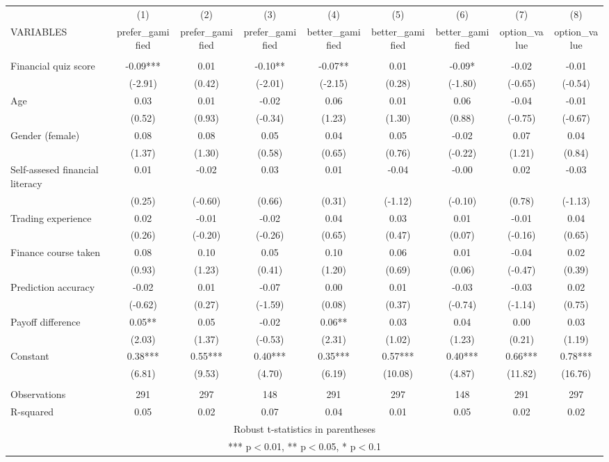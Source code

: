 \documentclass[]{article}
\begin{document}
\begin{tabular}{lcccccccc} \hline
 & (1) & (2) & (3) & (4) & (5) & (6) & (7) & (8) \\
VARIABLES & prefer\_gamified & prefer\_gamified & prefer\_gamified & better\_gamified & better\_gamified & better\_gamified & option\_value & option\_value \\ \hline
 &  &  &  &  &  &  &  &  \\
Financial quiz score & -0.09*** & 0.01 & -0.10** & -0.07** & 0.01 & -0.09* & -0.02 & -0.01 \\
 & (-2.91) & (0.42) & (-2.01) & (-2.15) & (0.28) & (-1.80) & (-0.65) & (-0.54) \\
Age & 0.03 & 0.01 & -0.02 & 0.06 & 0.01 & 0.06 & -0.04 & -0.01 \\
 & (0.52) & (0.93) & (-0.34) & (1.23) & (1.30) & (0.88) & (-0.75) & (-0.67) \\
Gender (female) & 0.08 & 0.08 & 0.05 & 0.04 & 0.05 & -0.02 & 0.07 & 0.04 \\
 & (1.37) & (1.30) & (0.58) & (0.65) & (0.76) & (-0.22) & (1.21) & (0.84) \\
Self-assesed financial literacy & 0.01 & -0.02 & 0.03 & 0.01 & -0.04 & -0.00 & 0.02 & -0.03 \\
 & (0.25) & (-0.60) & (0.66) & (0.31) & (-1.12) & (-0.10) & (0.78) & (-1.13) \\
Trading experience & 0.02 & -0.01 & -0.02 & 0.04 & 0.03 & 0.01 & -0.01 & 0.04 \\
 & (0.26) & (-0.20) & (-0.26) & (0.65) & (0.47) & (0.07) & (-0.16) & (0.65) \\
Finance course taken & 0.08 & 0.10 & 0.05 & 0.10 & 0.06 & 0.01 & -0.04 & 0.02 \\
 & (0.93) & (1.23) & (0.41) & (1.20) & (0.69) & (0.06) & (-0.47) & (0.39) \\
Prediction accuracy & -0.02 & 0.01 & -0.07 & 0.00 & 0.01 & -0.03 & -0.03 & 0.02 \\
 & (-0.62) & (0.27) & (-1.59) & (0.08) & (0.37) & (-0.74) & (-1.14) & (0.75) \\
Payoff difference & 0.05** & 0.05 & -0.02 & 0.06** & 0.03 & 0.04 & 0.00 & 0.03 \\
 & (2.03) & (1.37) & (-0.53) & (2.31) & (1.02) & (1.23) & (0.21) & (1.19) \\
Constant & 0.38*** & 0.55*** & 0.40*** & 0.35*** & 0.57*** & 0.40*** & 0.66*** & 0.78*** \\
 & (6.81) & (9.53) & (4.70) & (6.19) & (10.08) & (4.87) & (11.82) & (16.76) \\
 &  &  &  &  &  &  &  &  \\
Observations & 291 & 297 & 148 & 291 & 297 & 148 & 291 & 297 \\
 R-squared & 0.05 & 0.02 & 0.07 & 0.04 & 0.01 & 0.05 & 0.02 & 0.02 \\ \hline
\multicolumn{9}{c}{ Robust t-statistics in parentheses} \\
\multicolumn{9}{c}{ *** p$<$0.01, ** p$<$0.05, * p$<$0.1} \\
\end{tabular}
\end{document}
